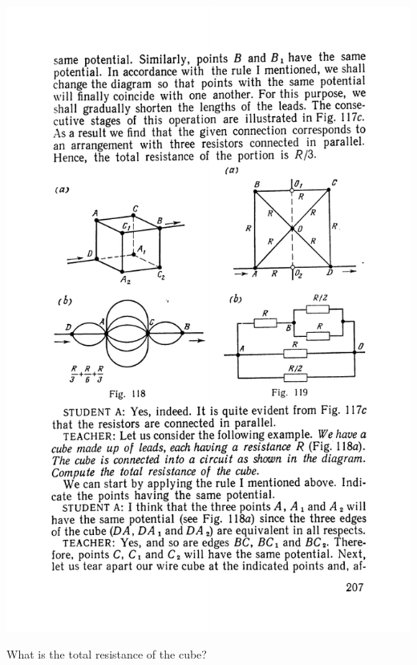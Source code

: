 \documentclass[a4paper,sfsidenotes]{tufte-book}
\begin{document}
\begin{marginfigure}%
\centering
\includegraphics[width=\linewidth]{fig-118a}
\caption{ What is the total resistance of the cube?}
\label{fig-118}
\end{marginfigure}
\end{document}
